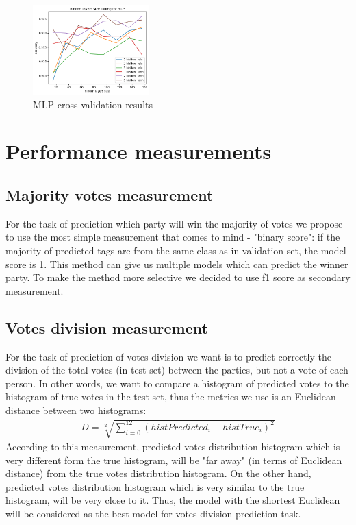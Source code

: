\documentclass[12pt]{article}
\begin{document}
\begin{figure}[h]
\centering
\includegraphics[width=0.4\textwidth]{Cross_valid_plots/mlp_h_fig}
\caption{MLP cross validation results}
\end{figure}

\newpage
\section{Performance measurements}
\subsection{Majority votes measurement}
For the task of prediction which party will win the majority of votes we propose to use the most simple measurement that comes to mind - "binary score": if the majority of predicted tags are from the same class as in validation set, the model score is 1. This method can give us multiple models which can predict the winner party. To make the method more selective we decided to use f1 score as secondary measurement.

\subsection{Votes division measurement}
For the task of prediction of votes division we want is to predict correctly the division of the total votes (in test set) between the parties, but not a vote of each person. In other words, we want to compare a histogram of predicted votes to the histogram of true votes in the test set, thus the metrics we use is an Euclidean distance between two histograms:
\begin{gather*}
D = \sqrt[2]{\sum_{i=0}^{12} (histPredicted_i - histTrue_i)^2}   
\end{gather*}
According to this measurement, predicted votes distribution histogram which is very different form the true histogram, will be "far away" (in terms of Euclidean distance) from the true votes distribution histogram. On the other hand, predicted votes distribution histogram which is very similar to the true histogram, will be very close to it. Thus, the model with the shortest Euclidean will be considered as the best model for votes division prediction task.
\end{document}
